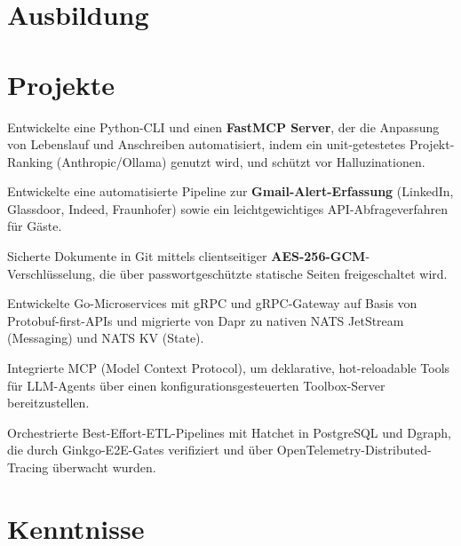 \documentclass[10pt,a4paper]{resume}
\begin{document}
\section{Ausbildung}

\vspace{2pt}

\section{Projekte}

\bullets
  \item Entwickelte eine Python-CLI und einen \textbf{FastMCP Server}, der die Anpassung von Lebenslauf und Anschreiben automatisiert, indem ein unit-getestetes Projekt-Ranking (Anthropic/Ollama) genutzt wird, und schützt vor Halluzinationen.
  \item Entwickelte eine automatisierte Pipeline zur \textbf{Gmail-Alert-Erfassung} (LinkedIn, Glassdoor, Indeed, Fraunhofer) sowie ein leichtgewichtiges API-Abfrageverfahren für Gäste.
  \item Sicherte Dokumente in Git mittels clientseitiger \textbf{AES-256-GCM}-Verschlüsselung, die über passwortgeschützte statische Seiten freigeschaltet wird.
\bulletsend
\vspace{1.0pt}
\bullets
  \item Entwickelte Go-Microservices mit gRPC und gRPC-Gateway auf Basis von Protobuf-first-APIs und migrierte von Dapr zu nativen NATS JetStream (Messaging) und NATS KV (State).
  \item Integrierte MCP (Model Context Protocol), um deklarative, hot-reloadable Tools für LLM-Agents über einen konfigurationsgesteuerten Toolbox-Server bereitzustellen.
  \item Orchestrierte Best-Effort-ETL-Pipelines mit Hatchet in PostgreSQL und Dgraph, die durch Ginkgo-E2E-Gates verifiziert und über OpenTelemetry-Distributed-Tracing überwacht wurden.
\bulletsend

\section{Kenntnisse}
\end{document}
